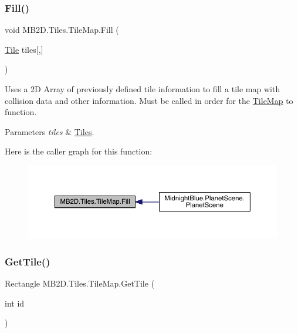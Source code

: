 \subsubsection{\texorpdfstring{Fill()}{Fill()}}
{\footnotesize\ttfamily void M\+B2\+D.\+Tiles.\+Tile\+Map.\+Fill (\begin{DoxyParamCaption}\item[{\hyperlink{class_m_b2_d_1_1_tile}{Tile}}]{tiles\mbox{[},\mbox{]} }\end{DoxyParamCaption})\hspace{0.3cm}{\ttfamily [inline]}}



Uses a 2D Array of previously defined tile information to fill a tile map with collision data and other information. Must be called in order for the \hyperlink{class_m_b2_d_1_1_tiles_1_1_tile_map}{Tile\+Map} to function. 


\begin{DoxyParams}{Parameters}
{\em tiles} & \hyperlink{namespace_m_b2_d_1_1_tiles}{Tiles}.\\
\hline
\end{DoxyParams}
Here is the caller graph for this function\+:\nopagebreak
\begin{figure}[H]
\begin{center}
\leavevmode
\includegraphics[width=350pt]{class_m_b2_d_1_1_tiles_1_1_tile_map_acc786702f8dfb76227fcd76ce0b20510_icgraph}
\end{center}
\end{figure}
\hypertarget{class_m_b2_d_1_1_tiles_1_1_tile_map_a483549827f26a5282888728f20b56a8a}{}\label{class_m_b2_d_1_1_tiles_1_1_tile_map_a483549827f26a5282888728f20b56a8a} 
\subsubsection{\texorpdfstring{Get\+Tile()}{GetTile()}}
{\footnotesize\ttfamily Rectangle M\+B2\+D.\+Tiles.\+Tile\+Map.\+Get\+Tile (\begin{DoxyParamCaption}\item[{int}]{id }\end{DoxyParamCaption})\hspace{0.3cm}{\ttfamily [inline]}}



